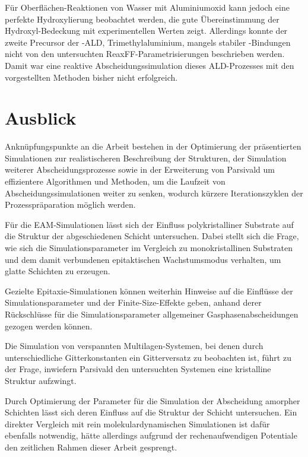 Für Oberflächen-Reaktionen von Wasser mit Aluminiumoxid kann jedoch eine perfekte Hydroxylierung beobachtet werden, die gute Übereinstimmung der Hydroxyl-Bedeckung mit experimentellen Werten zeigt.
Allerdings konnte der zweite Precursor der -ALD, Trimethylaluminium, mangels stabiler -Bindungen nicht von den untersuchten ReaxFF-Parametrisierungen beschrieben werden.
Damit war eine reaktive Abscheidungssimulation dieses ALD-Prozesses mit den vorgestellten Methoden bisher nicht erfolgreich.

\section{Ausblick}
Anknüpfungspunkte an die Arbeit bestehen in der Optimierung der präsentierten Simulationen zur realistischeren Beschreibung der Strukturen, der Simulation weiterer Abscheidungsprozesse sowie in der Erweiterung von Parsivald um effizientere Algorithmen und Methoden, um die Laufzeit von Abscheidungssimulationen weiter zu senken, wodurch kürzere Iterationszyklen der Prozesspräparation möglich werden.

Für die EAM-Simulationen lässt sich der Einfluss polykristalliner Substrate auf die Struktur der abgeschiedenen Schicht untersuchen.
Dabei stellt sich die Frage, wie sich die Simulationsparameter im Vergleich zu monokristallinen Substraten und dem damit verbundenen epitaktischen Wachstumsmodus verhalten, um glatte Schichten zu erzeugen.

Gezielte Epitaxie-Simulationen können weiterhin Hinweise auf die Einflüsse der Simulationsparameter und der Finite-Size-Effekte geben, anhand derer Rückschlüsse für die Simulationsparameter allgemeiner Gasphasenabscheidungen gezogen werden können.

Die Simulation von verspannten Multilagen-Systemen, bei denen durch unterschiedliche Gitterkonstanten ein Gitterversatz zu beobachten ist, führt zu der Frage, inwiefern Parsivald den untersuchten Systemen eine kristalline Struktur aufzwingt.

Durch Optimierung der Parameter für die Simulation der Abscheidung amorpher Schichten lässt sich deren Einfluss auf die Struktur der Schicht untersuchen.
Ein direkter Vergleich mit rein molekulardynamischen Simulationen ist dafür ebenfalls notwendig, hätte allerdings aufgrund der rechenaufwendigen Potentiale den zeitlichen Rahmen dieser Arbeit gesprengt.

